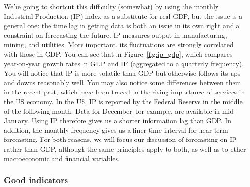 \documentclass[letterpaper,12pt]{article}
\begin{document}
We're going to shortcut this difficulty (somewhat) by using the
monthly Industrial Production (IP) index as a substitute for real
GDP, but the issue is a general one:  the time lag in getting data
is both an issue in its own right and a  constraint on forecasting
the future. IP measures output in manufacturing, mining, and
utilities. More important, its fluctuations are strongly
correlated with those in GDP.  You can see that in
Figure~\ref{fig:ip_gdp}, which compares year-on-year growth rates
in GDP and IP (aggregated to a quarterly frequency). You will
notice that IP is more volatile than GDP but otherwise follows its
ups and downs reasonably well.  You may also notice some
differences between them in the recent past, which have been
traced to the rising importance of services in the US economy.  In
the US, IP is reported by the Federal Reserve in the middle of the
following month.  Data for December, for example, are available in
mid-January.  Using IP therefore gives us a shorter information
lag than GDP.  In addition, the monthly frequency gives us a finer
time interval for near-term forecasting.  For both reasons, we
will focus our discussion of forecasting on IP rather than GDP,
although the same principles apply to both, as well as to other
macroeconomic and financial variables.

\subsubsection*{Good indicators}
\end{document}
